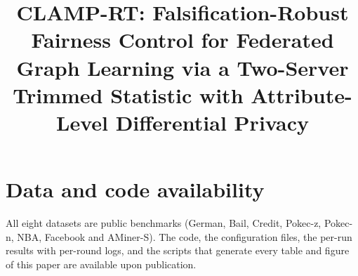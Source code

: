 \documentclass[preprint,12pt]{elsarticle}
\theoremstyle{plain}
\theoremstyle{definition}
\theoremstyle{remark}
\begin{document}
\begin{frontmatter}

\title{CLAMP-RT: Falsification-Robust Fairness Control for Federated Graph Learning via a Two-Server Trimmed Statistic with Attribute-Level Differential Privacy}



\end{frontmatter}











\section*{Data and code availability}
All eight datasets are public benchmarks (German, Bail, Credit, Pokec-z, Pokec-n, NBA, Facebook and AMiner-S). The code, the configuration files, the per-run results with per-round logs, and the scripts that generate every table and figure of this paper are available upon publication.



\end{document}
